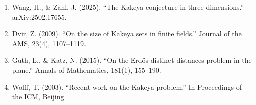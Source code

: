 \begin{enumerate}
\item Wang, H., \& Zahl, J. (2025). ``The Kakeya conjecture in three dimensions.'' arXiv:2502.17655.
\item Dvir, Z. (2009). ``On the size of Kakeya sets in finite fields.'' Journal of the AMS, 23(4), 1107--1119.
\item Guth, L., \& Katz, N. (2015). ``On the Erd\H{o}s distinct distances problem in the plane.'' Annals of Mathematics, 181(1), 155--190.
\item Wolff, T. (2003). ``Recent work on the Kakeya problem.'' In Proceedings of the ICM, Beijing.
\end{enumerate}
